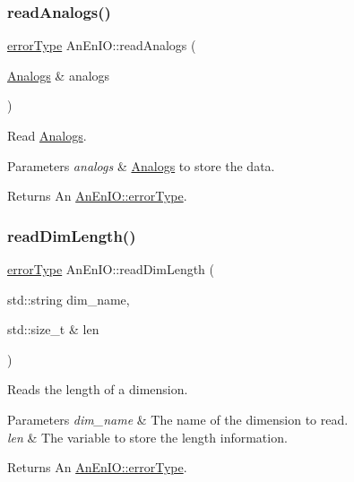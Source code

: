 \mbox{\label{class_an_en_i_o_ab9199c18d2a4a1e005dc5b1fefe6e75b}} 
\subsubsection{\texorpdfstring{read\+Analogs()}{readAnalogs()}}
{\footnotesize\ttfamily \mbox{\hyperlink{class_an_en_i_o_aa56bc1ec6610b86db4349bce20f9ead0}{error\+Type}} An\+En\+I\+O\+::read\+Analogs (\begin{DoxyParamCaption}\item[{\mbox{\hyperlink{class_analogs}{Analogs}} \&}]{analogs }\end{DoxyParamCaption})}

Read \mbox{\hyperlink{class_analogs}{Analogs}}. 
\begin{DoxyParams}{Parameters}
{\em analogs} & \mbox{\hyperlink{class_analogs}{Analogs}} to store the data. \\
\hline
\end{DoxyParams}
\begin{DoxyReturn}{Returns}
An \mbox{\hyperlink{class_an_en_i_o_aa56bc1ec6610b86db4349bce20f9ead0}{An\+En\+I\+O\+::error\+Type}}. 
\end{DoxyReturn}
\mbox{\label{class_an_en_i_o_a5ca1c7df3da9720967d7ed06f2dfe09b}} 
\subsubsection{\texorpdfstring{read\+Dim\+Length()}{readDimLength()}}
{\footnotesize\ttfamily \mbox{\hyperlink{class_an_en_i_o_aa56bc1ec6610b86db4349bce20f9ead0}{error\+Type}} An\+En\+I\+O\+::read\+Dim\+Length (\begin{DoxyParamCaption}\item[{std\+::string}]{dim\+\_\+name,  }\item[{std\+::size\+\_\+t \&}]{len }\end{DoxyParamCaption})}

Reads the length of a dimension.


\begin{DoxyParams}{Parameters}
{\em dim\+\_\+name} & The name of the dimension to read. \\
\hline
{\em len} & The variable to store the length information. \\
\hline
\end{DoxyParams}
\begin{DoxyReturn}{Returns}
An \mbox{\hyperlink{class_an_en_i_o_aa56bc1ec6610b86db4349bce20f9ead0}{An\+En\+I\+O\+::error\+Type}}. 
\end{DoxyReturn}
\mbox{\label{class_an_en_i_o_aa58735032dd6f54c83d6450842922d3f}} 
